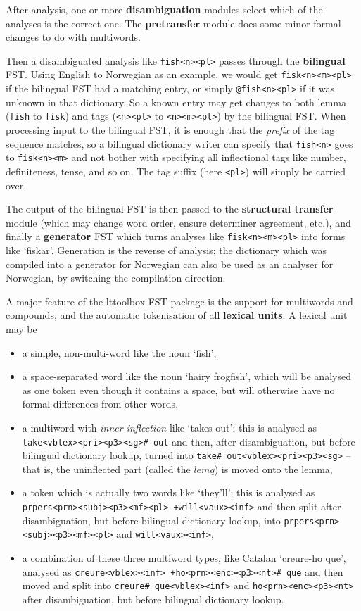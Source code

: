 \documentclass[10pt, a4paper]{article}
\newcommand{\ana}[1]{\texttt{#1}}
\newcommand{\f}[1]{`#1'}
\begin{document}
After analysis, one or more \textbf{disambiguation} modules select
which of the analyses is the correct one. The \textbf{pretransfer}
module does some minor formal changes to do with multiwords.

Then a disambiguated analysis like \ana{fish<n><pl>} passes through
the \textbf{bilingual} FST. Using English to Norwegian as an example,
we would get \ana{fisk<n><m><pl>} if the bilingual FST had a matching
entry, or simply \ana{@fish<n><pl>} if it was unknown in that
dictionary. So a known entry may get changes to both lemma (\ana{fish}
to \ana{fisk}) and tags (\ana{<n><pl>} to \ana{<n><m><pl>}) by the
bilingual FST. When processing input to the bilingual FST, it is
enough that the \emph{prefix} of the tag sequence matches, so a
bilingual dictionary writer can specify that \ana{fish<n>} goes to
\ana{fisk<n><m>} and not bother with specifying all inflectional tags
like number, definiteness, tense, and so on. The tag suffix (here
\ana{<pl>}) will simply be carried over.

The output of the bilingual FST is then passed to the
\textbf{structural transfer} module (which may change word order,
ensure determiner agreement, etc.), and finally a \textbf{generator}
FST which turns analyses like \ana{fisk<n><m><pl>} into forms like
\f{fiskar}. Generation is the reverse of analysis; the dictionary
which was compiled into a generator for Norwegian can also be used as
an analyser for Norwegian, by switching the compilation direction.

A major feature of the lttoolbox FST package is the support
for multiwords and compounds, and the automatic tokenisation of all
\textbf{lexical units}. A lexical unit may be
\begin{itemize}
\item a simple, non-multi-word like the noun \f{fish},
\item a space-separated word like the noun \f{hairy frogfish}, which
  will be analysed as one token even though it contains a space, but
  will otherwise have no formal
  differences from other words,
\item a multiword with \emph{inner inflection} like \f{takes out}; this is
  analysed as \ana{take<vblex><pri><p3><sg>\# out} and then, after
  disambiguation, but before bilingual dictionary lookup, turned into
  \ana{take\# out<vblex><pri><p3><sg>} -- that is, the uninflected part
  (called the $lemq$) is moved onto the lemma,
\item a token which is actually two words like \f{they'll}; this is
  analysed as \ana{prpers<prn><subj><p3><mf><pl> +will<vaux><inf>} and
  then split after disambiguation, but before bilingual dictionary
  lookup, into \ana{prpers<prn><subj><p3><mf><pl>} and
  \ana{will<vaux><inf>},
\item a combination of these three multiword types, like Catalan
  \f{creure-ho que}, analysed as \ana{creure<vblex><inf>
    +ho<prn><enc><p3><nt>\# que} and then moved and split into
  \ana{creure\# que<vblex><inf>} and \ana{ho<prn><enc><p3><nt>} after
  disambiguation, but before bilingual dictionary lookup.
\end{itemize}
\end{document}
